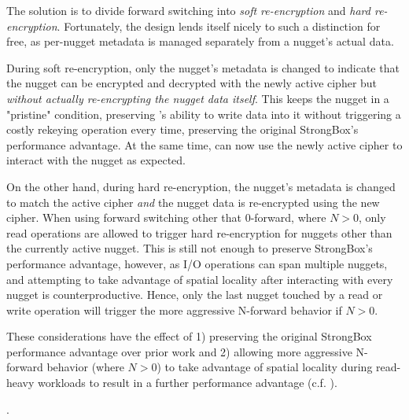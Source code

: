 The solution is to divide forward switching into \emph{soft re-encryption} and
\emph{hard re-encryption}. Fortunately, the \SYSTEM{} design lends itself nicely
to such a distinction for free, as per-nugget metadata is managed separately
from a nugget's actual data.

During soft re-encryption, only the nugget's metadata is changed to indicate
that the nugget can be encrypted and decrypted with the newly active cipher but
\emph{without actually re-encrypting the nugget data itself}. This keeps the
nugget in a "pristine" condition, preserving \SYSTEM{}'s ability to write data
into it without triggering a costly rekeying operation every time, preserving
the original StrongBox's performance advantage. At the same time, \SYSTEM{} can
now use the newly active cipher to interact with the nugget as expected.

On the other hand, during hard re-encryption, the nugget's metadata is changed
to match the active cipher \emph{and} the nugget data is re-encrypted using the
new cipher. When using forward switching other that 0-forward, 
where $N > 0$, only read operations are allowed to trigger hard re-encryption
for nuggets other than the currently active nugget. This is still not enough to
preserve StrongBox's performance advantage, however, as I/O operations can span
multiple nuggets, and attempting to take advantage of spatial locality after
interacting with every nugget is counterproductive. Hence, only the last nugget
touched by a read or write operation will trigger the more aggressive N-forward
behavior if $N > 0$.

These considerations have the effect of 1) preserving the original StrongBox
performance advantage over prior work and 2) allowing more aggressive N-forward
behavior (where $N > 0$) to take advantage of spatial locality during read-heavy
workloads to result in a further performance advantage (c.f.
).

.

